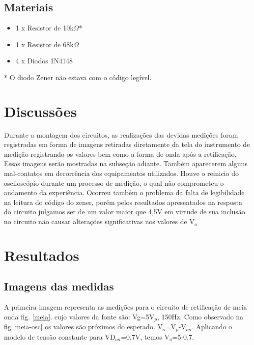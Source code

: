 \subsection{Materiais}

\begin{itemize}
\item 1 x Resistor de 10k$\Omega$*
\item 1 x Resistor de 68k$\Omega$
\item 4 x Diodos 1N4148

\end{itemize}

* O diodo Zener não estava com o código legível. 


\section{Discussões}
 Durante a montagem dos circuitos, as realizações das devidas medições foram registradas em forma de imagens retiradas diretamente da tela do instrumento de medição registrando os valores bem como a forma de onda após a retificação. Essas imagens serão mostradas na subseção adiante.
 Também aparecerem alguns mal-contatos em decorrência dos equipamentos utilizados.
 Houve o reinicio do osciloscópio durante um processo de medição, o qual não comprometeu o andamento da experiência.
 Ocorreu também o problema da falta de legibilidade na leitura do código do zener, porém pelos resultados apresentados na resposta do circuito julgamos ser de um valor maior que 4,5V em virtude de sua inclusão no circuito não causar alterações significativas nos valores de V$_o$

\section{Resultados}
\subsection{Imagens das medidas}

 A primeira imagem representa as medições para o circuito de retificação de meia onda fig. \ref{meia}. cujo valores da fonte são: Vg=5V$_p$, 150Hz.
Como observado na fig.\ref{meia-osc} os valores são próximos do esperado. V$_o$=V$_p$-V$_{on}$. Aplicando o modelo de tensão constante para VD$_{on}$=0,7V, temos V$_{o}$=5-0,7. 

